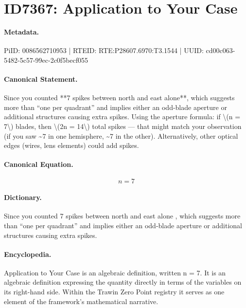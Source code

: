 \section*{ID7367: Application to Your Case}
\paragraph{Metadata.}
PiID: 0086562710953 | RTEID: RTE:P28607.6970:T3.1544 | UUID: cd00c063-5482-5c57-99ec-2c0f5becf055

\paragraph{Canonical Statement.}
Since you counted **7 spikes between north and east alone**, which suggests more than “one per quadrant” and implies either an odd-blade aperture or additional structures causing extra spikes. Using the aperture formula: if \textbackslash{}(n = 7\textbackslash{}) blades, then \textbackslash{}(2n = 14\textbackslash{}) total spikes — that might match your observation (if you saw \textasciitilde{}7 in one hemisphere, \textasciitilde{}7 in the other). Alternatively, other optical edges (wires, lens elements) could add spikes.

\paragraph{Canonical Equation.}
\[
n = 7
\]

\paragraph{Dictionary.}
Since you counted 7 spikes between north and east alone , which suggests more than “one per quadrant” and implies either an odd-blade aperture or additional structures causing extra spikes.

\paragraph{Encyclopedia.}
Application to Your Case is an algebraic definition, written n = 7. It is an algebraic definition expressing the quantity directly in terms of the variables on its right-hand side. Within the Trawin Zero Point registry it serves as one element of the framework's mathematical narrative.
